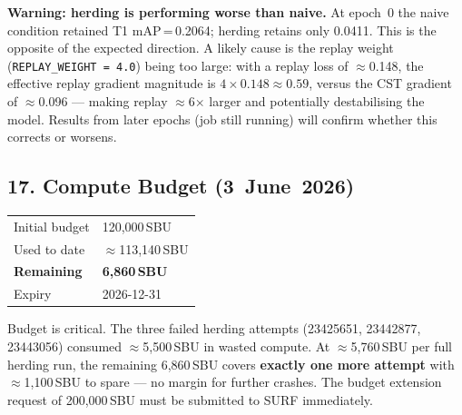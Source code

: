 \noindent \textbf{Warning: herding is performing worse than naive.}
At epoch~0 the naive condition retained T1 mAP\,=\,0.2064; herding
retains only 0.0411. This is the opposite of the expected direction.
A likely cause is the replay weight (\texttt{REPLAY\_WEIGHT\,=\,4.0})
being too large: with a replay loss of $\approx$0.148, the effective
replay gradient magnitude is $4\times0.148\approx0.59$, versus the
CST gradient of $\approx$0.096 — making replay $\approx$6$\times$
larger and potentially destabilising the model. Results from later
epochs (job still running) will confirm whether this corrects or worsens.

\subsection*{17. Compute Budget (3~June~2026)}

\begin{center}\small
\begin{tabular}{ll}
\hline
Initial budget    & 120,000\,SBU \\
Used to date      & $\approx$113,140\,SBU \\
\textbf{Remaining}& \textbf{6,860\,SBU} \\
Expiry            & 2026-12-31 \\
\hline
\end{tabular}
\end{center}

\noindent Budget is critical. The three failed herding attempts
(23425651, 23442877, 23443056) consumed $\approx$5,500\,SBU in wasted
compute. At $\approx$5,760\,SBU per full herding run, the remaining
6,860\,SBU covers \textbf{exactly one more attempt} with $\approx$1,100\,SBU
to spare --- no margin for further crashes. The budget extension request
of 200,000\,SBU must be submitted to SURF immediately.

